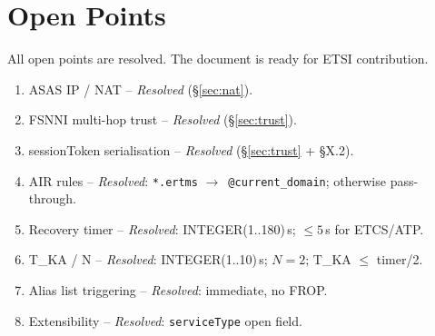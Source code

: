 \documentclass[11pt,a4paper]{article}
\newcommand{\arr}{$\to$}
\begin{document}
\section{Open Points}

All open points are resolved. The document is ready for ETSI contribution.

\begin{enumerate}[leftmargin=2em]
  \item[\st{1.}] ASAS IP / NAT -- \textit{Resolved} (§\ref{sec:nat}).
  \item[\st{2.}] FSNNI multi-hop trust -- \textit{Resolved} (§\ref{sec:trust}).
  \item[\st{3.}] sessionToken serialisation -- \textit{Resolved} (§\ref{sec:trust} + §X.2).
  \item[\st{4.}] AIR rules -- \textit{Resolved}: \texttt{*.ertms}
    \arr\ \texttt{@current\_domain}; otherwise pass-through.
  \item[\st{5.}] Recovery timer -- \textit{Resolved}: INTEGER(1..180)\,s;
    $\leq 5$\,s for ETCS/ATP.
  \item[\st{6.}] T\_KA / N -- \textit{Resolved}: INTEGER(1..10)\,s; $N=2$;
    T\_KA $\leq$ timer/2.
  \item[\st{7.}] Alias list triggering -- \textit{Resolved}: immediate, no FROP.
  \item[\st{8.}] Extensibility -- \textit{Resolved}: \texttt{serviceType} open field.
\end{enumerate}
\end{document}
